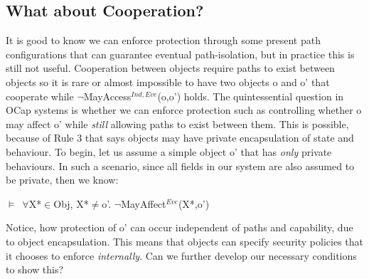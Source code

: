 \documentclass[a4paper,11pt, twoside,twocolumn]{article}
\newenvironment{logic}[1][]
{\begin{flushleft} \small }
{\end{flushleft}}
\newcommand{\loin}{$\in$}
\newcommand{\loforall}{$\forall$}
\newcommand{\loneq} {$\neq$}
\newcommand{\loturns} {$\vDash$}
\newcommand{\loneg}{$\boldsymbol \neg$}
\begin{document}
\subsection{What about Cooperation?}
It is good to know we can enforce protection through some present path configurations that can guarantee eventual path-isolation, but in practice this is still not useful. Cooperation between objects require paths to exist between objects so it is rare or almost impossible to have two objects o and o' that cooperate while \loneg MayAccess$^{Ind,Eve}$(o,o') holds. The quintessential question in OCap systems is whether we can enforce protection such as controlling whether o may affect o' while \textit{still} allowing paths to exist between them. This is possible, because of Rule 3 that says objects may have private encapsulation of state and behaviour. To begin, let us assume a simple object o' that has \textit{only} private behaviours. In such a scenario, since all fields in our system are also assumed to be private, then we know:
\begin{logic} \loturns\ \loforall X*\loin Obj, X*\loneq o'. \loneg MayAffect$^{Eve}$(X*,o') \end{logic}

Notice, how protection of o' can occur independent of paths and capability, due to object encapsulation. This means that objects can specify security policies that it chooses to enforce \textit{internally}. Can we further develop our necessary conditions to show this?\\
\end{document}
